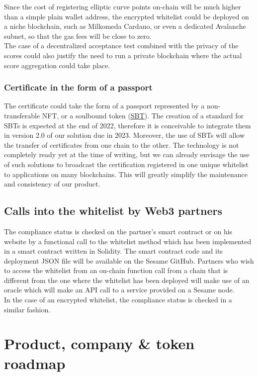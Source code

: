 ﻿\documentclass[a4paper]{article}
\begin{document}
Since the cost of registering elliptic curve points on-chain will be much higher than a simple plain wallet address, the encrypted whitelist could be deployed on a niche blockchain, such as Milkomeda Cardano, or even a dedicated Avalanche subnet, so that the gas fees will be close to zero. \\

The case of a decentralized acceptance test combined with the privacy of the scores could also justify the need to run a private blockchain where the actual score aggregation could take place.

\subsubsection{Certificate in the form of a passport}
The certificate could take the form of a passport represented by a non-transferable NFT, or a soulbound token (\href{https://vitalik.ca/general/2022/01/26/soulbound.html}{SBT}). The creation of a standard for SBTs is expected at the end of 2022, therefore it is conceivable to integrate them in version 2.0 of our solution due in 2023. 
Moreover, the use of SBTs will allow the transfer of certificates from one chain to the other. The technology is not completely ready yet at the time of writing, but we can already envisage the use of such solutions to broadcast the certification registered in one unique whitelist to applications on many blockchains. This will greatly simplify the maintenance and consistency of our product.

\subsection{Calls into the whitelist by Web3 partners}
The compliance status is checked on the partner's smart contract or on his website by a functional call to the whitelist method which has been implemented in a smart contract written in Solidity. The smart contract code and its deployment JSON file will be available on the Sesame GitHub.
Partners who wish to access the whitelist from an on-chain function call from a chain that is different from the one where the whitelist has been deployed will make use of an oracle which will make an API call to a service provided on a Sesame node. \\

In the case of an encrypted whitelist, the compliance status is checked in a similar fashion. 

\newpage
\section{Product, company \& token roadmap}
\end{document}
